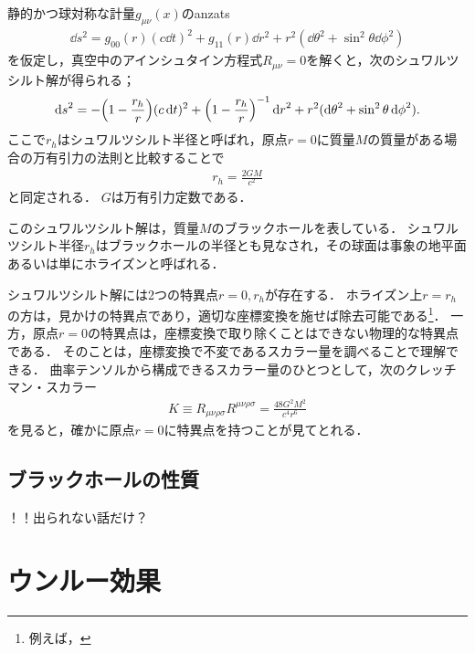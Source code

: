 \documentclass[uplatex,dvipdfmx]{vkaishi}
\begin{document}
静的かつ球対称な計量$g_{\mu\nu}(x)$のanzats
\begin{align*}
  \dd{s}^2 = g_{00}(r) (c\dd{t})^2 + g_{11}(r) \dd{r}^2 + r^2 (\dd{\theta}^2 + \sin^2\theta \dd{\phi}^2)
\end{align*}
を仮定し，真空中のアインシュタイン方程式$R_{\mu\nu} = 0$を解くと，次のシュワルツシルト解が得られる；
\begin{align}
  \dd{s}^2 = - \qty(1 - \frac{r_h}{r}) (c\dd{t})^2 + \qty(1 - \frac{r_h}{r})^{-1} \dd{r}^2 + r^2 (\dd{\theta}^2 + \sin^2\theta \dd{\phi}^2).
  \label{eq:Schwarzschild}
\end{align}
ここで$r_h$はシュワルツシルト半径と呼ばれ，原点$r=0$に質量$M$の質量がある場合の万有引力の法則と比較することで
\begin{align}
  r_h = \frac{2GM}{c^2}
\end{align}
と同定される．
$G$は万有引力定数である．

このシュワルツシルト解は，質量$M$のブラックホールを表している．
シュワルツシルト半径$r_h$はブラックホールの半径とも見なされ，その球面は事象の地平面あるいは単にホライズンと呼ばれる．

シュワルツシルト解には2つの特異点$r = 0, r_h$が存在する．
ホライズン上$r = r_h$の方は，見かけの特異点であり，適切な座標変換を施せば除去可能である\footnote{例えば，}．
一方，原点$r = 0$の特異点は，座標変換で取り除くことはできない物理的な特異点である．
そのことは，座標変換で不変であるスカラー量を調べることで理解できる．
曲率テンソルから構成できるスカラー量のひとつとして，次のクレッチマン・スカラー
\begin{align}
  K \equiv R_{\mu\nu\rho\sigma} R^{\mu\nu\rho\sigma} = \frac{48 G^2 M^2}{c^4 r^6}
\end{align}
を見ると，確かに原点$r = 0$に特異点を持つことが見てとれる．


\subsection{ブラックホールの性質}

！！出られない話だけ？






\section{ウンルー効果}
\end{document}
